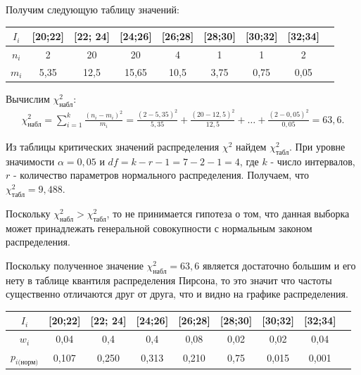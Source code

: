 \documentclass[utf8, a4paper, 14pt, russian, oneside]{book}
\begin{document}
Получим следующую таблицу значений:
\begin{table}[h!]
    \centering
    \begin{tabular}{|c|c|c|c|c|c|c|c|c|}
        \hline
        $I_i$  & [20;22] & [22; 24] & [24;26] & [26;28] & [28;30] & [30;32] & [32;34] \\
        \hline
        $n_i$ & 2 & 20 & 20 & 4 & 1 & 1 & 2 \\
        \hline
        $m_i$ & 5,35 & 12,5 & 15,65 & 10,5 & 3,75 & 0,75 & 0,05\\
        \hline
    \end{tabular}
\end{table}
\newpage

Вычислим $\chi^2_{\text{набл}}$:
\begin{align*}
    \chi^2_{\text{набл}} = \sum\limits_{i=1}^k \frac{(n_i - m_i)^2}{m_i} = \frac{(2 - 5,35)^2}{5,35} + \frac{(20 - 12,5)^2}{12,5} + \dots + \frac{(2 - 0,05)^2}{0,05} = 63,6.
\end{align*}

Из таблицы критических значений распределения $\chi^2$ найдем $\chi^2_{\text{табл}}$.
При уровне значимости $\alpha = 0,05$ и $df = k - r -1 = 7 - 2 - 1 = 4$,
где $k$ - число интервалов, $r$ - количество параметров нормального распределения. Получаем, что $\chi^2_{\text{табл}} = 9,488$.

Поскольку $\chi^2_{\text{набл}} > \chi^2_{\text{табл}}$, то не принимается гипотеза о том, что данная выборка может принадлежать генеральной совокупности
с нормальным законом распределения.


Поскольку полученное значение $\chi^2_{\text{набл}} = 63,6$ является достаточно большим и его нету в таблице квантиля распределения Пирсона, то
это значит что частоты существенно отличаются друг от друга, что и видно на графике распределения.

\begin{table}[h!]
    \centering
    \begin{tabular}{|c|c|c|c|c|c|c|c|c|}
        \hline
        $I_i$  & [20;22] & [22; 24] & [24;26] & [26;28] & [28;30] & [30;32] & [32;34] \\
        \hline
        $w_i$ & 0,04 & 0,4 & 0,4 & 0,08 & 0,02 & 0,02 & 0,04 \\
        \hline
        $p_{i\text{(норм)}}$ & 0,107 & 0,250 & 0,313 & 0,210 & 0,75 & 0,015 & 0,001 \\
        \hline
    \end{tabular}
\end{table}
\end{document}
